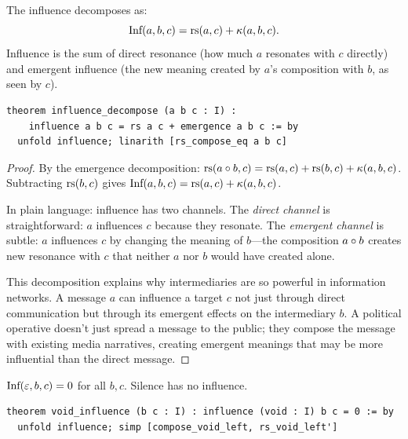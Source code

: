 \begin{theorem}
\label{thm:influence-decomp}
The influence decomposes as:
\[
  \text{Inf}(a, b, c) = \mathrm{rs}(a, c) + \kappa(a, b, c).
\]
Influence is the sum of direct resonance (how much $a$ resonates with $c$
directly) and emergent influence (the new meaning created by $a$'s
composition with $b$, as seen by $c$).

\begin{lstlisting}[caption={Lean 4: Influence decomposition}]
theorem influence_decompose (a b c : I) :
    influence a b c = rs a c + emergence a b c := by
  unfold influence; linarith [rs_compose_eq a b c]
\end{lstlisting}
\end{theorem}

\begin{proof}
By the emergence decomposition: $\mathrm{rs}(a \circ b, c) = \mathrm{rs}(a, c) + \mathrm{rs}(b, c)
+ \kappa(a, b, c)$.  Subtracting $\mathrm{rs}(b, c)$ gives $\text{Inf}(a, b, c) =
\mathrm{rs}(a, c) + \kappa(a, b, c)$.

In plain language: influence has two channels.  The \emph{direct channel}
is straightforward: $a$ influences $c$ because they resonate.  The
\emph{emergent channel} is subtle: $a$ influences $c$ by changing the
meaning of $b$---the composition $a \circ b$ creates new resonance
with $c$ that neither $a$ nor $b$ would have created alone.

This decomposition explains why intermediaries are so powerful in information
networks.  A message $a$ can influence a target $c$ not just through direct
communication but through its emergent effects on the intermediary $b$.
A political operative doesn't just spread a message to the public; they
compose the message with existing media narratives, creating emergent
meanings that may be more influential than the direct message.
\end{proof}

\begin{theorem}
\label{thm:void-influence}
$\text{Inf}(\varepsilon, b, c) = 0$ for all $b, c$.  Silence has no influence.

\begin{lstlisting}[caption={Lean 4: Void influence}]
theorem void_influence (b c : I) : influence (void : I) b c = 0 := by
  unfold influence; simp [compose_void_left, rs_void_left']
\end{lstlisting}
\end{theorem}


